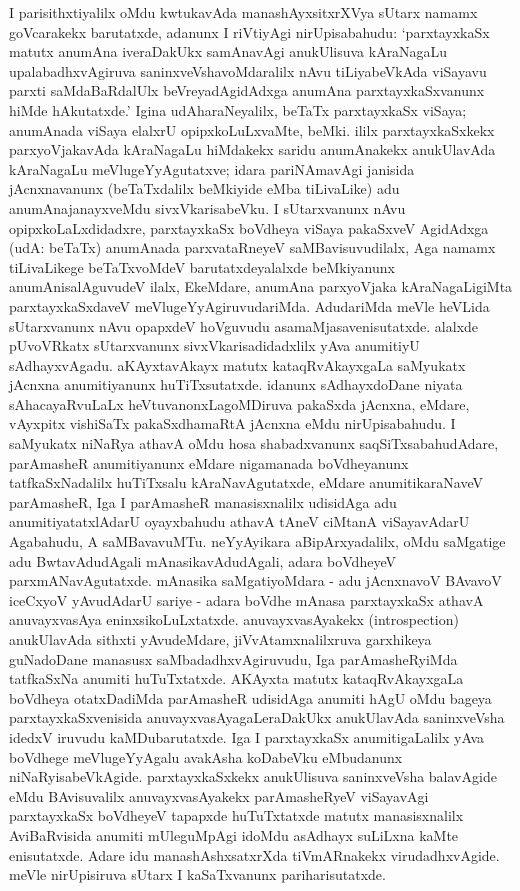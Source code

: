 I parisithxtiyalilx oMdu kwtukavAda manashAyxsitxrXVya sUtarx namamx goVcarakekx baru\-tatxde, adanunx I riVtiyAgi nirUpisabahudu: `parxtayxkaSx matutx anumAna iveraDakUkx samAnavAgi anukUlisuva kAraNagaLu upalabadhxvAgiruva saninxveVshavoMdaralilx nAvu tiLiyabeVkAda viSayavu parxti saMdaBaRdalUlx beVreyadAgidAdxga anumAna parxtayxkaSx\-vanunx hiMde hAkutatxde.' Igina udAharaNeyalilx, beTaTx parxtayxkaSx viSaya; anumAnada viSaya elalxrU opipxkoLuLxvaMte, beMki. ililx parxtayxkaSxkekx parxyoVjakavAda kAraNagaLu hiMdakekx saridu anumAnakekx anukUlavAda kAraNagaLu meVlugeY\-yAgutatxve; idara pariNAmavAgi janisida jAcnxnavanunx (beTaTxdalilx beMkiyide eMba tiLivaLike) adu anu\-mAna\-janayxveMdu sivxVkarisabeVku. I sUtarxvanunx nAvu opipxkoLaLxdidadxre, parxtayxkaSx boVdheya viSaya pakaSxveV AgidAdxga (udA: beTaTx) anumAnada parxvataRneyeV saMBavi\-suvudilalx, Aga namamx tiLivaLikege beTaTxvoMdeV barutatxdeyalalxde beMkiyanunx anu\-mAnisa\-lAguvudeV ilalx, EkeMdare, anumAna parxyoVjaka kAraNagaLigiMta parxtayxkaSxdaveV meVlu\-geYyAgiruvudariMda. AdudariMda meVle heVLida sUtarxvanunx nAvu opapxdeV hoVgu\-vudu asamaMjasavenisutatxde. alalxde pUvoVRkatx sUtarxvanunx sivxVkarisadidadxlilx yAva anumitiyU sAdhayxvAgadu. aKAyxtavAkayx matutx kataqRvAkayxgaLa saMyukatx \hbox{jAcnxna} anu\-mitiyanunx huTiTxsutatxde. idanunx sAdhayxdoDane niyata sAhacayaRvuLaLx heVtu\-vanonxLa\-goMDiruva pakaSxda jAcnxna, eMdare, vAyxpitx vishiSaTx pakaSxdhamaRtA jAcnxna eMdu nirUpisa\-bahudu. I saMyukatx niNaRya athavA oMdu hosa shabadxvanunx saqSiTxsabahudAdare, parAmasheR anumitiyanunx eMdare nigamanada boVdheyanunx tatfkaSxNadalilx huTiTxsalu kAraNavAgutatxde, eMdare anumitikaraNaveV parAmasheR, Iga I parAmasheR manasisx\-nalilx udisidAga adu anumitiyatatxlAdarU oyayxbahudu athavA tAneV \hbox{ciMtanA} viSayavAdarU Agabahudu, A saMBavavuMTu. neYyAyikara aBipArxya\-dalilx, oMdu saMgatige adu BwtavAdudAgali mAnasikavAdudAgali, adara boVdheyeV parxmANa\-vAgutatxde. mAnasika saMgatiyoMdara - adu jAcnxnavoV BAvavoV iceCxyoV yAvudAdarU sariye - adara boVdhe mAnasa parxtayxkaSx athavA anuvayxvasAya eninxsi\-koLuLxtatxde. anuvayxvasAyakekx {\rm(introspection)} anukUlavAda sithxti yAvu\-deMdare, jiVvAtamxnalilxruva garxhikeya guNadoDane manasusx saMbadadhxvAgiruvudu, Iga parA\-masheR\-yiMda tatfkaSxNa anumiti huTuTxtatxde. AKAyxta matutx kataqRvAkayxgaLa boVdheya otatxDa\-diMda parAmasheR udisidAga anumiti hAgU oMdu bageya parxtayxkaSxvenisida anu\-vayxvasAyagaLeraDakUkx anukUlavAda saninxveVsha idedxV iruvudu kaMDubarutatxde. Iga I parxtayxkaSx anumitigaLalilx yAva boVdhege meVlugeYyAgalu avakAsha koDabeVku eMbudanunx niNaRyisabeVkAgide. parxtayxkaSxkekx anukUlisuva saninxveVsha balavAgide eMdu BAvisuvalilx anuvayxvasAyakekx parAmasheRyeV viSayavAgi parxtayxkaSx boVdheyeV \hbox{tapapxde} huTuTxtatxde matutx manasisxnalilx AviBaRvisida anumiti mUleguMpAgi idoMdu \hbox{asAdhayx} suLiLxna kaMte enisutatxde. Adare idu manashAshxsatxrXda tiVmARnakekx virudadhxvAgide. meVle nirUpisiruva sUtarx I kaSaTxvanunx pariharisutatxde.

